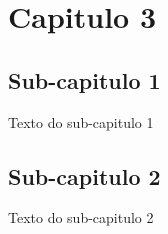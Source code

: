 
\chapter{Capitulo 3}
\section{Sub-capitulo 1}
Texto do sub-capitulo 1
\section{Sub-capitulo 2}
Texto do sub-capitulo 2